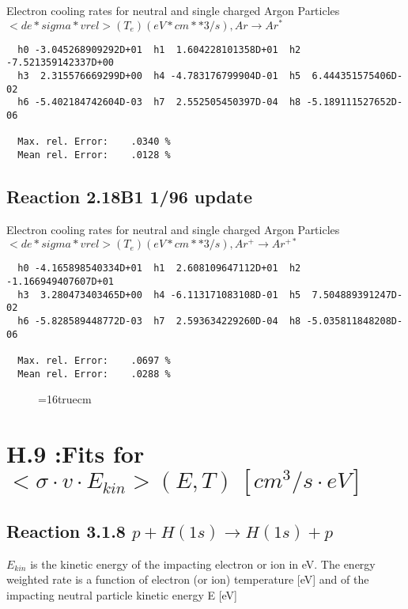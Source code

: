 \documentclass[12pt]{article}
\begin{document}
  Electron cooling rates for neutral and single
  charged Argon Particles
 $<de*sigma*vrel>(T_e)  (eV*cm**3/s), Ar  \rightarrow Ar^* $

\begin{small}\begin{verbatim}
  h0 -3.045268909292D+01  h1  1.604228101358D+01  h2 -7.521359142337D+00
  h3  2.315576669299D+00  h4 -4.783176799904D-01  h5  6.444351575406D-02
  h6 -5.402184742604D-03  h7  2.552505450397D-04  h8 -5.189111527652D-06

  Max. rel. Error:    .0340 %
  Mean rel. Error:    .0128 %

\end{verbatim}\end{small}


\subsection{
Reaction 2.18B1                   1/96 update
}

  Electron cooling rates for neutral and single
  charged Argon Particles
 $ <de*sigma*vrel>(T_e)  (eV*cm**3/s), Ar^+ \rightarrow Ar^{+*} $

\begin{small}\begin{verbatim}
  h0 -4.165898540334D+01  h1  2.608109647112D+01  h2 -1.166949407607D+01
  h3  3.280473403465D+00  h4 -6.113171083108D-01  h5  7.504889391247D-02
  h6 -5.828589448772D-03  h7  2.593634229260D-04  h8 -5.035811848208D-06

  Max. rel. Error:    .0697 %
  Mean rel. Error:    .0288 %

\end{verbatim}\end{small}

\begin{figure} \label{2.18Bl}
\epsfxsize=16truecm
\end{figure}
\newpage



\section{H.9 :Fits for $<\sigma \cdot v \cdot E_{kin}> (E,T) \ [cm^3/s
\cdot eV]$}

\subsection{
Reaction 3.1.8   $p + H(1s)  \rightarrow  H(1s) + p $
}
$E_{kin}$ is the kinetic energy of the impacting electron or ion in eV.
The energy weighted rate is a function of electron (or ion) temperature
[eV]  and of the impacting neutral particle kinetic energy E [eV]
\end{document}

